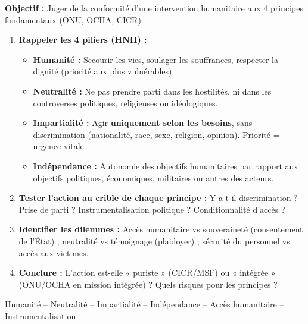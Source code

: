 \documentclass[11pt]{article}
\newcommand{\cle}[1]{{\popxbold\color{popdark}#1}}
\begin{document}
\begin{methode}
\textbf{Objectif :} Juger de la conformité d'une intervention humanitaire aux 4 principes fondamentaux (ONU, OCHA, CICR).
\begin{enumerate}
    \item \textbf{Rappeler les 4 piliers (HNII) :}
    \begin{itemize}
        \item \textbf{Humanité :} Secourir les vies, soulager les souffrances, respecter la dignité (priorité aux plus vulnérables).
        \item \textbf{Neutralité :} Ne pas prendre parti dans les hostilités, ni dans les controverses politiques, religieuses ou idéologiques.
        \item \textbf{Impartialité :} Agir \textbf{uniquement selon les besoins}, sans discrimination (nationalité, race, sexe, religion, opinion). Priorité = urgence vitale.
        \item \textbf{Indépendance :} Autonomie des objectifs humanitaires par rapport aux objectifs politiques, économiques, militaires ou autres des acteurs.
    \end{itemize}
    \item \textbf{Tester l'action au crible de chaque principe :} Y a-t-il discrimination ? Prise de parti ? Instrumentalisation politique ? Conditionnalité d'accès ?
    \item \textbf{Identifier les dilemmes :} Accès humanitaire vs souveraineté (consentement de l'État) ; neutralité vs témoignage (plaidoyer) ; sécurité du personnel vs accès aux victimes.
    \item \textbf{Conclure :} L'action est-elle « puriste » (CICR/MSF) ou « intégrée » (ONU/OCHA en mission intégrée) ? Quels risques pour les principes ?
\end{enumerate}
\cle{Humanité} -- \cle{Neutralité} -- \cle{Impartialité} -- \cle{Indépendance} -- \cle{Accès humanitaire} -- \cle{Instrumentalisation}
\end{methode}
\end{document}
